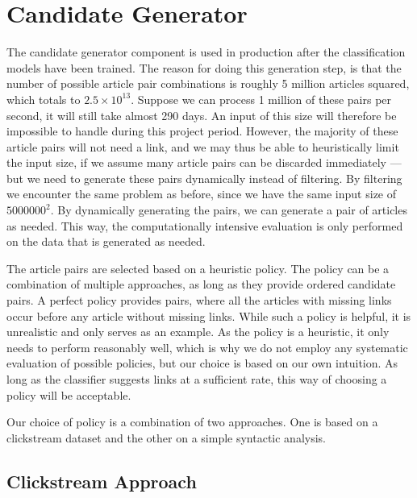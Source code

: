 \section{Candidate Generator}
The candidate generator component is used in production after the classification models have been trained. The reason for doing this generation step, is that the number of possible article pair combinations is roughly 5 million articles squared, which totals to $2.5 \times 10^{13}$. Suppose we can process 1 million of these pairs per second, it will still take almost 290 days. An input of this size will therefore be impossible to handle during this project period. However, the majority of these article pairs will not need a link, and we may thus be able to heuristically limit the input size, if we assume many article pairs can be discarded immediately --- but we need to generate these pairs dynamically instead of filtering. By filtering we encounter the same problem as before, since we have the same input size of $\num{5000000}^2$. By dynamically generating the pairs, we can generate a pair of articles as needed. This way, the computationally intensive evaluation is only performed on the data that is generated as needed.



The article pairs are selected based on a heuristic policy. The policy can be a combination of multiple approaches, as long as they provide ordered candidate pairs. A perfect policy provides pairs, where all the articles with missing links occur before any article without missing links. While such a policy is helpful, it is unrealistic and only serves as an example. As the policy is a heuristic, it only needs to perform reasonably well, which is why we do not employ any systematic evaluation of possible policies, but our choice is based on our own intuition. As long as the classifier suggests links at a sufficient rate, this way of choosing a policy will be acceptable.

Our choice of policy is a combination of two approaches. One is based on a clickstream dataset and the other on a simple syntactic analysis.

\subsection{Clickstream Approach}

